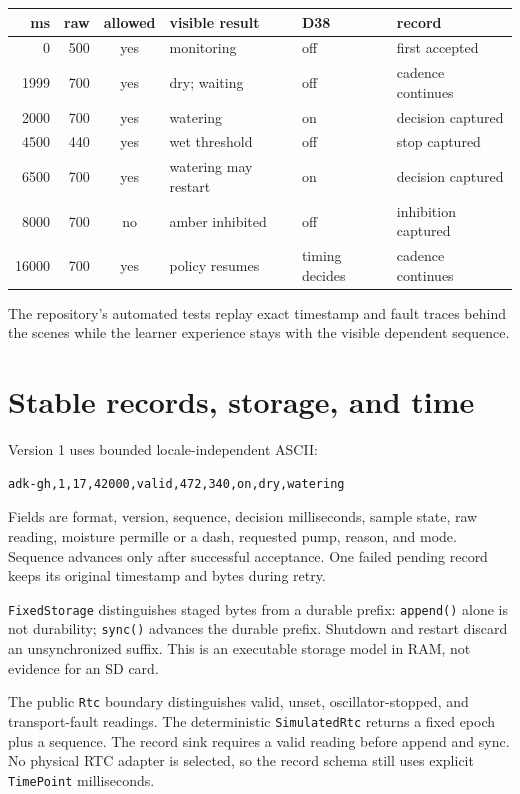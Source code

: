 \documentclass[11pt]{article}
\begin{document}
\begin{tabularx}{\linewidth}{@{}r r c X X X@{}}
\toprule
ms & raw & allowed & visible result & D38 & record\\
\midrule
0 & 500 & yes & monitoring & off & first accepted\\
1999 & 700 & yes & dry; waiting & off & cadence continues\\
2000 & 700 & yes & watering & on & decision captured\\
4500 & 440 & yes & wet threshold & off & stop captured\\
6500 & 700 & yes & watering may restart & on & decision captured\\
8000 & 700 & no & amber inhibited & off & inhibition captured\\
16000 & 700 & yes & policy resumes & timing decides & cadence continues\\
\bottomrule
\end{tabularx}

The repository's automated tests replay exact timestamp and fault traces
behind the scenes while the learner experience stays with the visible
dependent sequence.

\section{Stable records, storage, and time}

Version 1 uses bounded locale-independent ASCII:

\begin{lstlisting}[style=adkcpp]
adk-gh,1,17,42000,valid,472,340,on,dry,watering
\end{lstlisting}

Fields are format, version, sequence, decision milliseconds, sample state, raw
reading, moisture permille or a dash, requested pump, reason, and mode.
Sequence advances only after successful acceptance. One failed pending record
keeps its original timestamp and bytes during retry.

\texttt{FixedStorage} distinguishes staged bytes from a durable prefix:
\texttt{append()} alone is not durability; \texttt{sync()} advances the durable
prefix. Shutdown and restart discard an unsynchronized suffix. This is an
executable storage model in RAM, not evidence for an SD card.

The public \texttt{Rtc} boundary distinguishes valid, unset,
oscillator-stopped, and transport-fault readings. The deterministic
\texttt{SimulatedRtc} returns a fixed epoch plus a sequence. The record sink
requires a valid reading before append and sync. No physical RTC adapter is
selected, so the record schema still uses explicit \texttt{TimePoint}
milliseconds.
\end{document}
